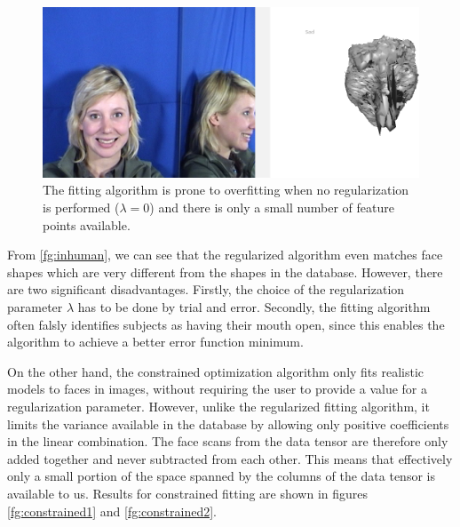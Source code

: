 \documentclass[11pt,a4paper,twoside]{report}
\begin{document}
\begin{figure}[H]
\centering
\includegraphics[scale=0.32]{images/reg_bad.png}
\caption{The fitting algorithm is prone to overfitting when no regularization
  is performed ($\lambda=0$) and there is only a small number of feature points available.}\label{fg:regularization2}
\end{figure}

From \ref{fg:inhuman}, we can see that the regularized algorithm even matches face shapes which
are very different from the shapes in the database. However, there are two
significant disadvantages. Firstly, the choice of the regularization parameter $\lambda$
has to be done by trial and error. Secondly, the fitting algorithm often falsly
identifies subjects as having their mouth open, since this enables the algorithm
to achieve a better error function minimum.

On the other hand, the constrained optimization algorithm only fits realistic
models to faces in images, without requiring the user to provide a value for a
regularization parameter. However, unlike the regularized fitting algorithm, it
limits the variance available in the database by allowing only positive
coefficients in the linear combination. The face scans from the data tensor are therefore only added
together and never subtracted from each other. This means that effectively only
a small portion of the space spanned by the columns of the data tensor is
available to us. Results for constrained fitting are shown in figures
\ref{fg:constrained1} and \ref{fg:constrained2}.
\end{document}
